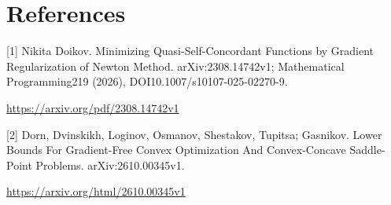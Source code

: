 \documentclass[10pt,a4paper]{article}
\begin{document}
\section{References}
[1] Nikita Doikov. Minimizing Quasi-Self-Concordant Functions by Gradient Regularization of Newton Method. arXiv:2308.14742v1; Mathematical Programming219 (2026), DOI10.1007/s10107-025-02270-9.

\url{https://arxiv.org/pdf/2308.14742v1}

[2] Dorn, Dvinskikh, Loginov, Osmanov, Shestakov, Tupitsa; Gasnikov. Lower Bounds For Gradient-Free Convex Optimization And Convex-Concave Saddle-Point Problems. arXiv:2610.00345v1.

\url{https://arxiv.org/html/2610.00345v1}
\end{document}
